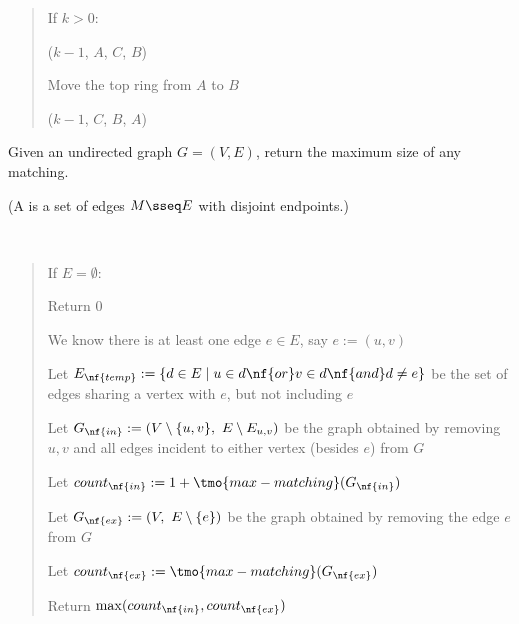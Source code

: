 \documentclass[10pt]{article}
\begin{document}
\begin{solution}
\begin{quote}
%

\begin{steps}
  \item If \( k > 0 \):
    \begin{steps}
    \item {}(\( k-1 \), \( A \), \( C \), \( B \))
    \item Move the top ring from \( A \) to \( B \)
    \item {}(\( k-1 \), \( C \), \( B \), \( A \))
    \end{steps}
\end{steps}
\end{quote}
\end{solution}
\pagebreak

Given an undirected graph \( G = (V, E) \), return the maximum size of any matching.

(A  is a set of edges \( M \sseq E \) with disjoint endpoints.)

\begin{solution}\ %
\begin{quote}%
\noindent{}%

%

\begin{steps}
  \item If \( E = \emptyset \):
    \begin{steps}
    \item Return 0
    \end{steps}
  \item We know there is at least one edge \( e \in E \), say \( e := (u, v) \)
  \item Let \( E_{\nf{temp}} := \{d\in E \mid u\in d \nf{ or } v\in d \nf{ and } d\neq e\} \) be the set of edges sharing a vertex with \( e \), but not including \( e \)
  \item Let \( G_{\nf{in}} := (V\setminus \{u,v\},\ E\setminus E_{u,v}) \) be the graph obtained by removing  \( u,v \) and all edges incident to either vertex (besides \( e \)) from \( G \)
  \item Let \( count_{\nf{in}} := 1+\tmo{max-matching}(G_{\nf{in}}) \) 
  \item Let \( G_{\nf{ex}} := (V,\ E\setminus\{e\}) \) be the graph obtained by removing the edge \( e \) from \( G \)
  \item Let \( count_{\nf{ex}} := \tmo{max-matching}(G_{\nf{ex}}) \) 
  \item Return \( \max(count_{\nf{in}}, count_{\nf{ex}}) \)
\end{steps}
\end{quote}%
\end{solution}%
\pagebreak
\end{document}

